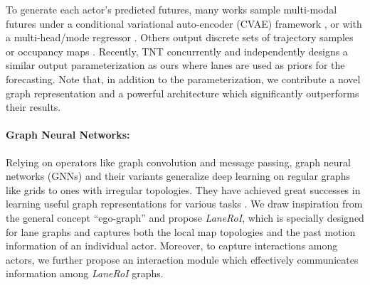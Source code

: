 To generate each actor's predicted futures, many works sample multi-modal futures under a conditional variational auto-encoder (CVAE) framework
\cite{desire,r2p2,mfp,precog,ilvm}, or with a multi-head/mode regressor
\cite{lgn,cui2019multimodal,mercat2020multi}.
Others output discrete sets of
trajectory samples \cite{dsd,covernet,multipath} or occupancy maps
\cite{jain2019discrete,p3}. Recently, TNT \cite{tnt}
concurrently and independently designs a similar output parameterization as ours
where lanes are used as priors for the forecasting. 
Note that, in addition to the parameterization, we contribute a novel graph representation and a powerful
architecture which significantly outperforms their results.



\paragraph{Graph Neural Networks:}


Relying on operators like graph convolution and message passing, graph neural networks (GNNs) and their variants \cite{scarselli2008graph,bruna2013spectral,li2015gated,kipf2016semi,hamilton2017inductive,liao2019lanczosnet} generalize deep learning on regular graphs like grids to ones with irregular topologies.
They have achieved great successes in learning useful graph representations for
various tasks \cite{monti2017geometric,qi20173d,teney2017graph,li2017situation,garcia2018few}.
We draw inspiration from the general concept ``ego-graph'' and propose \textit{LaneRoI}, which is specially designed for lane graphs and captures both the local map topologies and the past motion information of an individual actor.
Moreover, to capture interactions among actors, we further propose an
interaction module which effectively communicates information among
\textit{LaneRoI} graphs.

